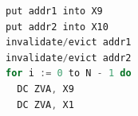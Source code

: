\begin{lstlisting}[language=c,caption=Cache line zeroing using DC ZVA, label=lst:dczva]
put addr1 into X9
put addr2 into X10
invalidate/evict addr1 
invalidate/evict addr2 
for i := 0 to N - 1 do 
  DC ZVA, X9 
  DC ZVA, X1
\end{lstlisting}
